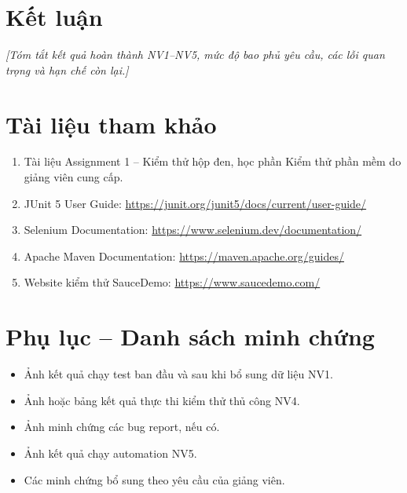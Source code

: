 \documentclass[a4paper,12pt]{article}
\newcommand{\fillin}[1]{\textit{[#1]}}
\begin{document}
\section{Kết luận}
\fillin{Tóm tắt kết quả hoàn thành NV1--NV5, mức độ bao phủ yêu cầu, các lỗi quan trọng và hạn chế còn lại.}

\section{Tài liệu tham khảo}
\begin{enumerate}[leftmargin=1.25cm]
  \item Tài liệu Assignment 1 -- Kiểm thử hộp đen, học phần Kiểm thử phần mềm do giảng viên cung cấp.
  \item JUnit 5 User Guide: \url{https://junit.org/junit5/docs/current/user-guide/}
  \item Selenium Documentation: \url{https://www.selenium.dev/documentation/}
  \item Apache Maven Documentation: \url{https://maven.apache.org/guides/}
  \item Website kiểm thử SauceDemo: \url{https://www.saucedemo.com/}
\end{enumerate}

\appendix
\section{Phụ lục -- Danh sách minh chứng}
\begin{itemize}[leftmargin=1.25cm]
  \item Ảnh kết quả chạy test ban đầu và sau khi bổ sung dữ liệu NV1.
  \item Ảnh hoặc bảng kết quả thực thi kiểm thử thủ công NV4.
  \item Ảnh minh chứng các bug report, nếu có.
  \item Ảnh kết quả chạy automation NV5.
  \item Các minh chứng bổ sung theo yêu cầu của giảng viên.
\end{itemize}
\end{document}
